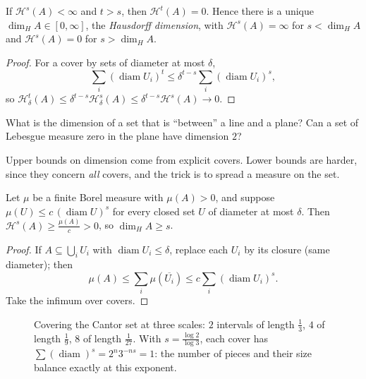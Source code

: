 \begin{proposition}\label{prop:jump}
If $\mathcal H^s(A)<\infty$ and $t>s$, then $\mathcal H^t(A)=0$. Hence there is a unique $\dim_HA\in[0,\infty]$, the \emph{Hausdorff dimension}, with $\mathcal H^s(A)=\infty$ for $s<\dim_HA$ and $\mathcal H^s(A)=0$ for $s>\dim_HA$.
\end{proposition}
\begin{proof}
For a cover by sets of diameter at most $\delta$, \[\sum_i(\operatorname{diam}U_i)^t\le\delta^{t-s}\sum_i(\operatorname{diam}U_i)^s,\] so $\mathcal H^t_\delta(A)\le\delta^{t-s}\mathcal H^s_\delta(A)\le\delta^{t-s}\mathcal H^s(A)\to0$.
\end{proof}

\begin{think}
What is the dimension of a set that is ``between'' a line and a plane? Can a set of Lebesgue measure zero in the plane have dimension $2$?
\end{think}

Upper bounds on dimension come from explicit covers. Lower bounds are harder, since they concern \emph{all} covers, and the trick is to spread a measure on the set.

\begin{lemma}\label{lem:massdist}
Let $\mu$ be a finite Borel measure with $\mu(A)>0$, and suppose $\mu(U)\le c\,(\operatorname{diam}U)^s$ for every closed set $U$ of diameter at most $\delta$. Then $\mathcal H^s(A)\ge\frac{\mu(A)}c>0$, so $\dim_HA\ge s$.
\end{lemma}
\begin{proof}
If $A\subseteq\bigcup_iU_i$ with $\operatorname{diam}U_i\le\delta$, replace each $U_i$ by its closure (same diameter); then \[\mu(A)\le\sum_i\mu(\overline{U_i})\le c\sum_i(\operatorname{diam}U_i)^s.\] Take the infimum over covers.
\end{proof}

\begin{figure}[ht]
\centering
{}
\caption{Covering the Cantor set at three scales: $2$ intervals of length $\frac13$, $4$ of length $\frac19$, $8$ of length $\frac1{27}$. With $s=\frac{\log2}{\log3}$, each cover has $\sum(\operatorname{diam})^s=2^n3^{-ns}=1$: the
number of pieces and their size balance exactly at this exponent.}
\label{fig:cantorcover}
\end{figure}

